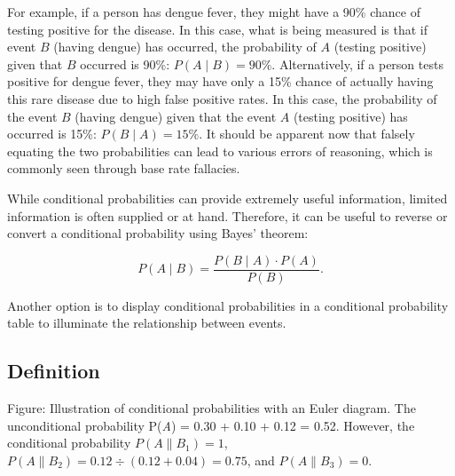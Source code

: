 For example, if a person has dengue fever, they might have a 90\% chance of testing
positive for the disease. In this case, what is being measured is that if event $B$
(having dengue) has occurred, the probability of $A$ (testing positive) given that $B$
occurred is 90\%: $P(A \mid B) = 90\%$. Alternatively, if a person tests positive for
dengue fever, they may have only a 15\% chance of actually having this rare disease due to
high false positive rates. In this case, the probability of the event $B$ (having dengue)
given that the event $A$ (testing positive) has occurred is 15\%: $P(B \mid A) = 15\%$. It
should be apparent now that falsely equating the two probabilities can lead to various
errors of reasoning, which is commonly seen through base rate fallacies.



While conditional probabilities can provide extremely useful information, limited
information is often supplied or at hand. Therefore, it can be useful to reverse or
convert a conditional probability using Bayes' theorem:

$$P(A \mid B) = \frac{P(B \mid A) \cdot P(A)}{P(B)}.$$

Another option is to display conditional probabilities in a conditional probability table
to illuminate the relationship between events.




\subsection{Definition}
\label{sss:defi-3061}







Figure: Illustration of conditional probabilities with an Euler diagram. The unconditional
probability P(\textit{A}) = 0.30 + 0.10 + 0.12 = 0.52. However, the conditional
probability $P(A \| B _{1}) = 1$, $P(A \| B _{2}) = 0.12 \div (0.12 + 0.04) = 0.75$, and
$P(A\|B _{3}) = 0$.






